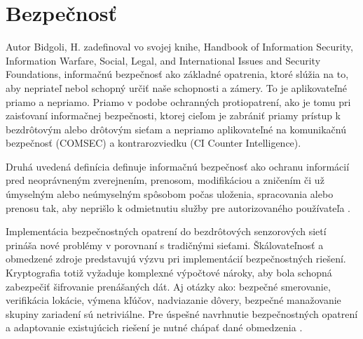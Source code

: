 \documentclass[12pt,a4paper,oneside,openright]{report}
\begin{document}
%

\section{Bezpečnosť}  \label{s_security}
Autor Bidgoli, H. zadefinoval vo svojej knihe, Handbook of Information Security, Information Warfare, Social, Legal, and International Issues and Security Foundations\cite{bidgoli2006handbook}, informačnú bezpečnosť ako základné opatrenia, ktoré slúžia na to, aby nepriateľ nebol schopný určiť naše schopnosti a zámery. To je aplikovateľné priamo a nepriamo. Priamo v  podobe ochranných protiopatrení, ako je tomu pri zaisťovaní informačnej bezpečnosti, ktorej cieľom je zabrániť priamy prístup k bezdrôtovým alebo drôtovým sieťam a nepriamo aplikovateľné na komunikačnú bezpečnosť (COMSEC) a kontrarozviedku (CI Counter Intelligence).

Druhá uvedená definícia definuje informačnú bezpečnosť ako ochranu informácií pred neoprávneným zverejnením, prenosom, modifikáciou a zničením či už úmyselným alebo neúmyselným spôsobom počas uloženia, spracovania alebo prenosu tak, aby neprišlo k odmietnutiu služby pre autorizovaného používateľa \cite{bidgoli2006handbook}.

Implementácia bezpečnostných opatrení do bezdrôtových senzorových sietí prináša nové problémy v porovnaní s tradičnými sieťami. Škálovateľnosť a obmedzené zdroje predstavujú výzvu pri implementácií bezpečnostných riešení. Kryptografia totiž vyžaduje komplexné výpočtové nároky, aby bola schopná zabezpečiť šifrovanie prenášaných dát. Aj otázky ako: bezpečné smerovanie, verifikácia lokácie, výmena kľúčov, nadviazanie dôvery, bezpečné manažovanie skupiny zariadení sú netriviálne.
Pre úspešné navrhnutie bezpečnostných opatrení a adaptovanie existujúcich riešení je nutné chápať dané obmedzenia \cite{bidgoli2006handbook}.
\end{document}
